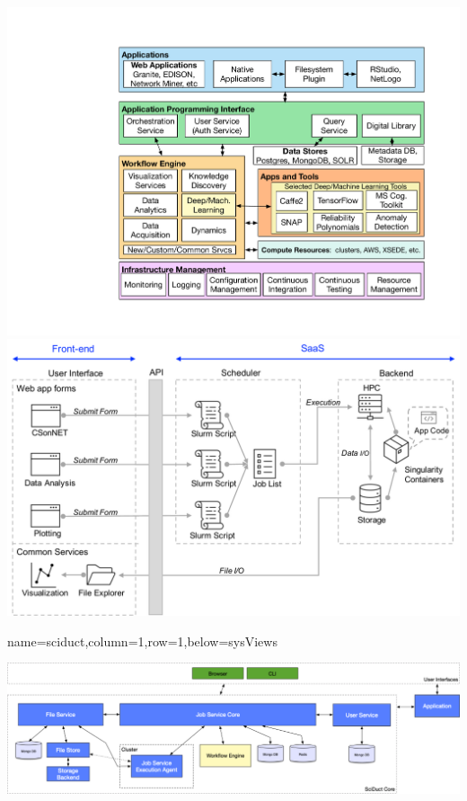 \documentclass[landscape,a0paper,fontscale=0.285]{baposter} %
\begin{document}
\begin{poster}
{\includegraphics[scale=0.2]{figures/CINSArchV7-v02.pdf}
\includegraphics[scale=0.2]{figures/netsci_ops_v6.pdf}

}

          {name=sciduct,column=1,row=1,below=sysViews}{
          
\includegraphics[scale=0.3]{figures/sciduct.png}
} 



\end{poster}
\end{document}
